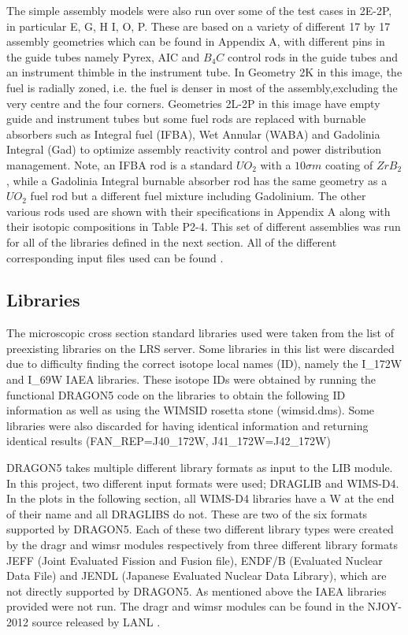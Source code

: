 \documentclass[12pt]{article}
\begin{document}
The simple assembly models were also run over some of the test cases in 2E-2P, in particular E, G, H I, O, P. These are based on a variety of different 17 by 17 assembly geometries which can be found in Appendix A, with different pins in the guide tubes namely Pyrex, AIC and $B_4C$ control rods in the guide tubes and an instrument thimble in the instrument tube. In Geometry 2K in this image, the fuel is radially zoned, i.e. the fuel is denser in most of the assembly,excluding the very centre and the four corners. Geometries 2L-2P in this image have empty guide and instrument tubes but some fuel rods are replaced with burnable absorbers such as Integral fuel (IFBA), Wet Annular (WABA) and Gadolinia Integral (Gad) to optimize assembly reactivity control and power distribution management. Note, an IFBA rod is a standard $UO_2$ with a $10\sigma m$ coating of $ZrB_2$, while a Gadolinia Integral burnable absorber rod has the same geometry as a $UO_2$ fuel rod but a different fuel mixture including Gadolinium. The other various rods used are shown with their specifications in Appendix A along with their isotopic compositions in Table P2-4. This set of different assemblies was run for all of the libraries defined in the next section. All of the different corresponding input files used can be found \href{https://github.com/alex-stuart/LRS_internship_repo/tree/main/dragon/filesToRun}{\color{blue}{here}}.

\subsection{Libraries}

The microscopic cross section standard libraries used were taken from the list of preexisting libraries on the LRS server. Some libraries in this list were discarded due to difficulty finding the correct isotope local names (ID), namely the I\_172W and I\_69W IAEA libraries. These isotope IDs were obtained by running the functional DRAGON5 code on the libraries to obtain the following ID information as well as using the WIMSID rosetta stone (wimsid.dms). Some libraries were also discarded for having identical information and returning identical results (FAN\_REP=J40\_172W, J41\_172W=J42\_172W)

DRAGON5 takes multiple different library formats as input to the LIB module. In this project, two different input formats were used; DRAGLIB and WIMS-D4. In the plots in the following section, all WIMS-D4 libraries have a W at the end of their name and all DRAGLIBS do not. These are two of the six formats supported by DRAGON5. Each of these two different library types were created by the dragr and wimsr modules respectively from three different library formats JEFF (Joint Evaluated Fission and Fusion file), ENDF/B (Evaluated Nuclear Data File) and JENDL (Japanese Evaluated Nuclear Data Library), which are not directly supported by DRAGON5. As mentioned above the IAEA libraries provided were not run. The dragr and wimsr modules can be found in the NJOY-2012 source released by LANL \href{https://www.polymtl.ca/merlin/pynjoy2012.htm}{\color{blue}{here}}. 
\end{document}
